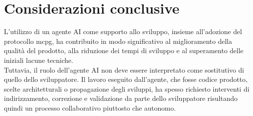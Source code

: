 \section{Considerazioni conclusive}

L’utilizzo di un agente AI come supporto allo sviluppo, insieme all’adozione del protocollo \gls{mcpg},
ha contribuito in modo significativo al miglioramento della qualità del prodotto,
alla riduzione dei tempi di sviluppo e al superamento delle iniziali lacune tecniche.\\
Tuttavia, il ruolo dell’agente AI non deve essere interpretato come sostitutivo di quello dello sviluppatore.
Il lavoro eseguito dall'agente, che fosse codice prodotto, scelte architetturali
o propagazione degli sviluppi, ha spesso richiesto interventi di indirizzamento, correzione e validazione
da parte dello sviluppatore risultando quindi un processo collaborativo piuttosto che autonomo.
